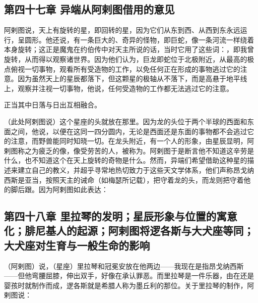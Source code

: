 
\subsection{第四十七章 异端从阿剌图借用的意见}

阿剌图说，天上有旋转的星，即回转的星，因为它们从东到西、从西到东永远运行，呈圆形。他还说，有一条巨大的、奇异的怪物，即巨蛇，像一条河流一样绕着本身旋转；这正是魔鬼在约伯传中对天主所说的话，当时它用了这些词：，即我曾旋转，从而得以观察诸世界。因为他们认为，巨龙即蛇位于北极附近，从最高的极点俯视一切事物，观看所有受造物的工作，以免任何正在形成的事物逃过它的注意。因为虽然天上的星辰都落下，但这颗星的极轴从不落下，而是高悬于地平线上，观察并注视一切事物，他说，任何受造物的工作都无法逃过它的注意。\par

正当其中\newline{}日落与日出互相融合。\par

（此处阿剌图说）这个星座的头就放在那里。因为龙的头位于两个半球的西面和东面之间，他说，以便在这同一四分圆内，无论是西面还是东面的事物都不会逃过它的注意，而野兽能同时知晓一切。在龙头附近，有一个人的形象，由星辰显明，阿剌图称之为疲乏的像，像受劳苦的人，被称为。阿剌图于是断言他不知道这辛劳是什么，也不知道这个在天上旋转的奇物是什么。然而，异端们希望借助这种星的描述来建立自己的教义，并超乎寻常地热切致力于这些天文学体系，他们声称昂戈纳西斯是亚当，按照天主的诫命（如梅瑟所记载），把守着龙的头，而龙则把守着他的脚后跟。因为阿剌图如此表达：\par

\par


\subsection{第四十八章 里拉琴的发明；星辰形象与位置的寓意化；腓尼基人的起源；阿剌图将逻各斯与大犬座等同；大犬座对生育与一般生命的影响}

（阿剌图）说，（星座）里拉琴和冠冕安放在他两边——我现在是指昂戈纳西斯——但他弯腰屈膝，伸出双手，好像在承认罪恶。而里拉琴是一件乐器，由在还是婴孩时就制作而成，逻各斯就是希腊人称为墨丘利的那位。关于里拉琴的制作，阿剌图说：\par

